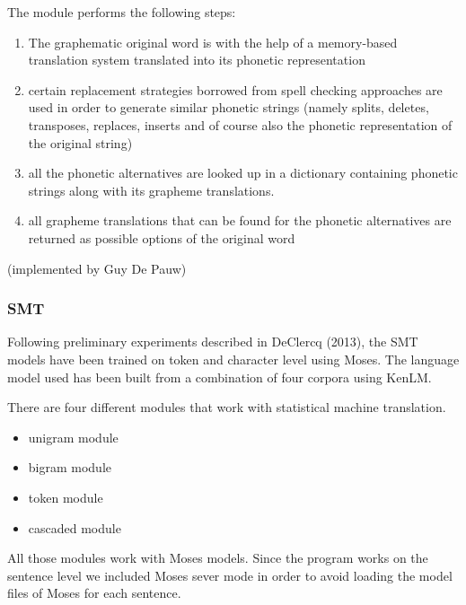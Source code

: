 \documentclass[letterpaper,10pt,english]{sphinxmanual}
\begin{document}
The module performs the following steps:
\begin{enumerate}
\item {} 
The graphematic original word is with the help of a memory-based translation system translated into its phonetic representation

\item {} 
certain replacement strategies borrowed from spell checking approaches are used in order to generate similar phonetic strings (namely splits, deletes, transposes, replaces, inserts and of course also the phonetic representation of the original string)

\item {} 
all the phonetic alternatives are looked up in a dictionary containing phonetic strings along with its grapheme translations.

\item {} 
all grapheme translations that can be found for the phonetic alternatives are returned as possible options of the original word

\end{enumerate}

(implemented by Guy De Pauw)


\subsubsection{SMT}
\label{README:smt}
Following preliminary experiments described in DeClercq (2013), the SMT models have been trained on token and character level using Moses. The language model used has been built from a combination of four corpora using KenLM.

There are four different modules that work with statistical machine translation.
\begin{itemize}
\item {} 
unigram module

\item {} 
bigram module

\item {} 
token module

\item {} 
cascaded module

\end{itemize}

All those modules work with Moses models. Since the program works on the sentence level we included Moses sever mode in order
to avoid loading the model files of Moses for each sentence.
\end{document}
